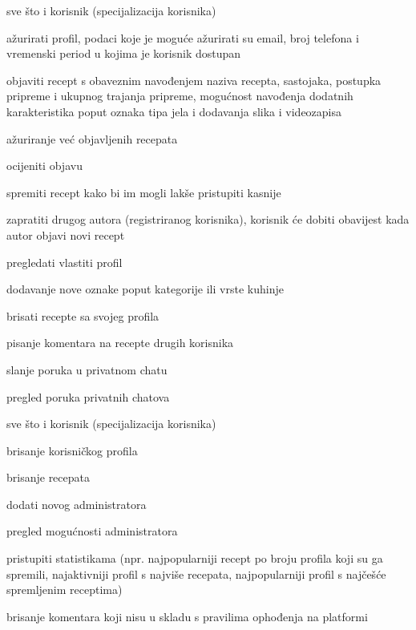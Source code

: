 \begin{packed_enum}
\begin{packed_enum}
					\item sve što i korisnik (specijalizacija korisnika)
					\item ažurirati profil, podaci koje je moguće ažurirati su email, broj telefona i vremenski period u kojima je korisnik dostupan
					\item objaviti recept s obaveznim navođenjem naziva recepta, sastojaka, postupka pripreme i ukupnog trajanja pripreme, mogućnost navođenja dodatnih karakteristika poput oznaka tipa jela i dodavanja slika i videozapisa
					\item ažuriranje već objavljenih recepata
					\item ocijeniti objavu
					\item spremiti recept kako bi im mogli lakše pristupiti kasnije
					\item zapratiti drugog autora (registriranog korisnika), korisnik će dobiti obavijest kada autor objavi novi recept
					\item pregledati vlastiti profil
					\item dodavanje nove oznake poput kategorije ili vrste kuhinje
					\item brisati recepte sa svojeg profila
					\item pisanje komentara na recepte drugih korisnika
					\item slanje poruka u privatnom chatu
					\item pregled poruka privatnih chatova
					
				\end{packed_enum}

				\item  {}
				\begin{packed_enum}

					\item sve što i korisnik (specijalizacija korisnika)
					\item brisanje korisničkog profila
					\item brisanje recepata
					\item dodati novog administratora
					\item pregled mogućnosti administratora
					\item pristupiti statistikama (npr. najpopularniji recept po broju profila koji su ga spremili, najaktivniji profil s najviše recepata, najpopularniji profil s najčešće spremljenim receptima)
					\item brisanje komentara koji nisu u skladu s pravilima ophođenja na platformi


\end{packed_enum}
\end{packed_enum}
